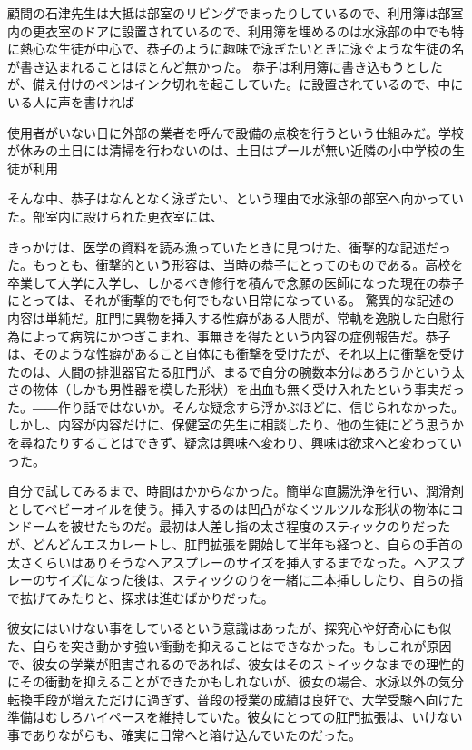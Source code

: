 顧問の石津先生は大抵は部室のリビングでまったりしているので、利用簿は部室内の更衣室のドアに設置されているので、利用簿を埋めるのは水泳部の中でも特に熱心な生徒が中心で、恭子のように趣味で泳ぎたいときに泳ぐような生徒の名が書き込まれることはほとんど無かった。
恭子は利用簿に書き込もうとしたが、備え付けのペンはインク切れを起こしていた。に設置されているので、中にいる人に声を書ければ



使用者がいない日に外部の業者を呼んで設備の点検を行うという仕組みだ。学校が休みの土日には清掃を行わないのは、土日はプールが無い近隣の小中学校の生徒が利用

そんな中、恭子はなんとなく泳ぎたい、という理由で水泳部の部室へ向かっていた。部室内に設けられた更衣室には、


きっかけは、医学の資料を読み漁っていたときに見つけた、衝撃的な記述だった。もっとも、衝撃的という形容は、当時の恭子にとってのものである。高校を卒業して大学に入学し、しかるべき修行を積んで念願の医師になった現在の恭子にとっては、それが衝撃的でも何でもない日常になっている。
驚異的な記述の内容は単純だ。肛門に異物を挿入する性癖がある人間が、常軌を逸脱した自慰行為によって病院にかつぎこまれ、事無きを得たという内容の症例報告だ。恭子は、そのような性癖があること自体にも衝撃を受けたが、それ以上に衝撃を受けたのは、人間の排泄器官たる肛門が、まるで自分の腕数本分はあろうかという太さの物体（しかも男性器を模した形状）を出血も無く受け入れたという事実だった。――作り話ではないか。そんな疑念すら浮かぶほどに、信じられなかった。しかし、内容が内容だけに、保健室の先生に相談したり、他の生徒にどう思うかを尋ねたりすることはできず、疑念は興味へ変わり、興味は欲求へと変わっていった。

自分で試してみるまで、時間はかからなかった。簡単な直腸洗浄を行い、潤滑剤としてベビーオイルを使う。挿入するのは凹凸がなくツルツルな形状の物体にコンドームを被せたものだ。最初は人差し指の太さ程度のスティックのりだったが、どんどんエスカレートし、肛門拡張を開始して半年も経つと、自らの手首の太さくらいはありそうなヘアスプレーのサイズを挿入するまでなった。ヘアスプレーのサイズになった後は、スティックのりを一緒に二本挿ししたり、自らの指で拡げてみたりと、探求は進むばかりだった。

彼女にはいけない事をしているという意識はあったが、探究心や好奇心にも似た、自らを突き動かす強い衝動を抑えることはできなかった。もしこれが原因で、彼女の学業が阻害されるのであれば、彼女はそのストイックなまでの理性的にその衝動を抑えることができたかもしれないが、彼女の場合、水泳以外の気分転換手段が増えただけに過ぎず、普段の授業の成績は良好で、大学受験へ向けた準備はむしろハイペースを維持していた。彼女にとっての肛門拡張は、いけない事でありながらも、確実に日常へと溶け込んでいたのだった。


